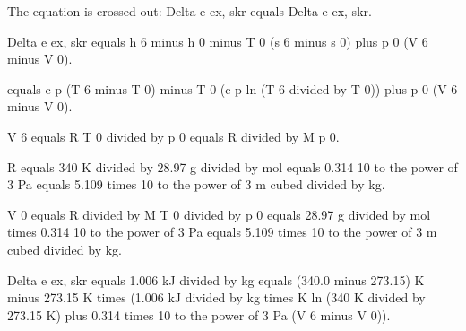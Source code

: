 The equation is crossed out: Delta e ex, skr equals Delta e ex, skr.

Delta e ex, skr equals h 6 minus h 0 minus T 0 (s 6 minus s 0) plus p 0 (V 6 minus V 0).

equals c p (T 6 minus T 0) minus T 0 (c p ln (T 6 divided by T 0)) plus p 0 (V 6 minus V 0).

V 6 equals R T 0 divided by p 0 equals R divided by M p 0.

R equals 340 K divided by 28.97 g divided by mol equals 0.314 10 to the power of 3 Pa equals 5.109 times 10 to the power of 3 m cubed divided by kg.

V 0 equals R divided by M T 0 divided by p 0 equals 28.97 g divided by mol times 0.314 10 to the power of 3 Pa equals 5.109 times 10 to the power of 3 m cubed divided by kg.

Delta e ex, skr equals 1.006 kJ divided by kg equals (340.0 minus 273.15) K minus 273.15 K times (1.006 kJ divided by kg times K ln (340 K divided by 273.15 K) plus 0.314 times 10 to the power of 3 Pa (V 6 minus V 0)).